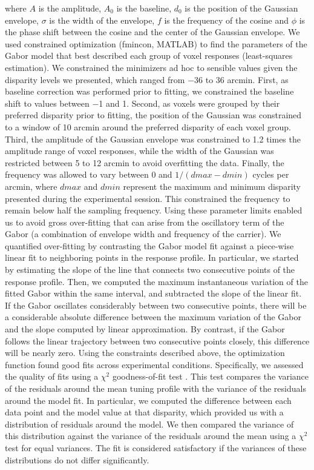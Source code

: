 where $A$ is the amplitude, $A_0$ is the baseline, $d_0$ is the position of the Gaussian envelope, $\sigma$ is the width of the envelope, $f$ is the frequency of the cosine and $\phi$ is the phase shift between the cosine and the center of the Gaussian envelope. We used constrained optimization (fmincon, MATLAB) to find the parameters of the Gabor model that best described each group of voxel responses (least-squares estimation). We constrained the minimizers ad hoc to sensible values given the disparity levels we presented, which ranged from $-$36 to 36 arcmin. First, as baseline correction was performed prior to fitting, we constrained the baseline shift to values between $-$1 and 1. Second, as voxels were grouped by their preferred disparity prior to fitting, the position of the Gaussian was constrained to a window of 10 arcmin around the preferred disparity of each voxel group. Third, the amplitude of the Gaussian envelope was constrained to 1.2 times the amplitude range of voxel responses, while the width of the Gaussian was restricted between 5 to 12 arcmin to avoid overfitting the data. Finally, the frequency was allowed to vary between $0$ and $1/(dmax - dmin)$ cycles per arcmin, where $dmax$ and $dmin$ represent the maximum and minimum disparity presented during the experimental session. This constrained the frequency to remain below half the sampling frequency. Using these parameter limits enabled us to avoid gross over-fitting that can arise from the oscillatory term of the Gabor (a combination of envelope width and frequency of the carrier). We quantified over-fitting by contrasting the Gabor model fit against a piece-wise linear fit to neighboring points in the response profile. In particular, we started by estimating the slope of the line that connects two consecutive points of the response profile. Then, we computed the maximum instantaneous variation of the fitted Gabor within the same interval, and subtracted the slope of the linear fit. If the Gabor oscillates considerably between two consecutive points, there will be a considerable absolute difference between the maximum variation of the Gabor and the slope computed by linear approximation. By contrast, if the Gabor follows the linear trajectory between two consecutive points closely, this difference will be nearly zero.
Using the constraints described above, the optimization function found good fits across experimental conditions. Specifically, we assessed the quality of fits using a $\chi^2$ goodness-of-fit test \cite{DeAngelis:2003nh}. This test compares the variance of the residuals around the mean tuning profile with the variance of the residuals around the model fit. In particular, we computed the difference between each data point and the model value at that disparity, which provided us with a distribution of residuals around the model. We then compared the variance of this distribution against the variance of the residuals around the mean using a $\chi^2$ test for equal variances. The fit is considered satisfactory if the variances of these distributions do not differ significantly. 
